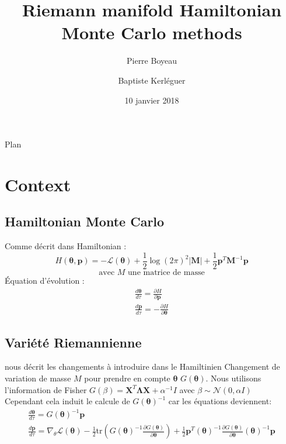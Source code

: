 \documentclass{beamer}
\title{Riemann manifold Hamiltonian Monte Carlo methods}
\author{Pierre Boyeau \and Baptiste Kerl\'eguer\\}\institute{École Normale Supérieure Paris-Saclay}
\date{10 janvier 2018}
\begin{document}
  \begin{frame}
  \titlepage
  \end{frame}
  
  \begin{frame}{Plan}
\tableofcontents
 \end{frame}
  
  \section{Context}
  
  \subsection{Hamiltonian Monte Carlo}
  \begin{frame}
  Comme décrit dans \cite{Duane1987}
  Hamiltonian : $$ H(\bm{\theta},\bm{p}) = -\mathcal{L}(\bm{\theta}) + \frac{1}{2} \log{(2\pi)^2|\bm{M}|} +\frac{1}{2} \bm{p}^T\bm{M}^{-1}\bm{p} \label{Hamiltonian}$$
  $$ \text{avec } M \text{ une matrice de masse}$$
  \'Equation d'\'evolution : 
  \begin{eqnarray}
  \frac{d\bm{\theta}}{d\tau} = \frac{\partial H}{\partial \bm{p}} \\
  \frac{d\bm{p}}{d\tau} = -\frac{\partial H}{\partial \bm{\theta}}
  \label{evolution}
  \end{eqnarray}  
  
  \end{frame}
  
  \subsection{Variété Riemannienne}
  \begin{frame}
  \cite{Girolami2011} nous décrit les changements à introduire dans le Hamiltinien
  Changement de variation de masse $M$ pour prendre en compte $\bm{\theta}$ $G(\bm{\theta})$. Nous utilisons l'information de Fisher $G(\beta)=\bm{X}^T\bm{\Lambda}\bm{X}+\alpha^{-1}I$ avec $ \beta \sim \mathcal{N}(0,\alpha I) $\\
  Cependant cela induit le calcule de $G(\bm{\theta})^{-1}$ car les équations deviennent:
  \begin{eqnarray}
  \frac{d\bm{\theta}}{d\tau} = G(\bm{\theta})^{-1}\bm{p} \\
  \frac{d\bm{p}}{d\tau} = \nabla_\theta\mathcal{L}(\bm{\theta})-\frac{1}{2}\text{tr}\left(G(\bm{\theta})^{-1}\frac{\partial G(\bm{\theta})}{\partial \bm{\theta}} \right)+\frac{1}{2}\bm{p}^T(\bm{\theta})^{-1}\frac{\partial G(\bm{\theta})}{\partial \bm{\theta}}(\bm{\theta})^{-1}\bm{p}
  \label{evolution}
  \end{eqnarray} 
  
  \end{frame}
  
\end{document}
